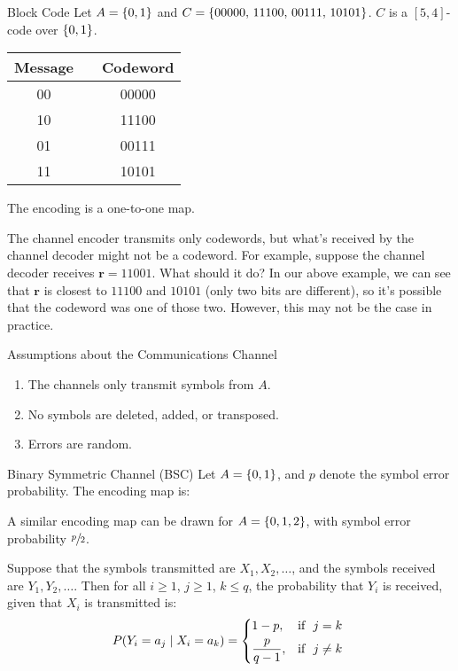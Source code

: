 \begin{Example}{Block Code}{}
    Let $ A=\{0,1\} $ and $ C=\{00000,\,11100,\,00111,\,10101\} $.
    $ C $ is a $ [5,4] $-code over $ \{0,1\} $.
    \begin{table}[H]
        \centering
        \begin{tabular}{@{}ccc@{}}
            Message & \textrightarrow{} & Codeword \\
            \midrule
            00      & \textrightarrow{} & 00000    \\
            10      & \textrightarrow{} & 11100    \\
            01      & \textrightarrow{} & 00111    \\
            11      & \textrightarrow{} & 10101    \\
        \end{tabular}
    \end{table}
    The encoding is a one-to-one map.
\end{Example}

The channel encoder transmits only codewords, but what's received by the channel
decoder might not be a codeword. For example, suppose the channel decoder
receives $ \symbf{r}=11001 $. What should it do? In our above example, we can see
that $ \symbf{r} $ is closest to $ 11100 $ and $ 10101 $ (only two bits are different),
so it's possible that the codeword was one of those two. However,
this may not be the case in practice.

\begin{Definition}{Assumptions about the Communications Channel}{}
    \begin{enumerate}[label=(\Roman*)]
        \item The channels only transmit symbols from $ A $.
        \item No symbols are deleted, added, or transposed.
        \item Errors are random.
    \end{enumerate}
\end{Definition}

\begin{Example}{Binary Symmetric Channel (BSC)}{}
    Let $ A=\{0,1\} $, and $ p $ denote the symbol error probability.
    The encoding map is:
    \begin{center}
        
    \end{center}
    A similar encoding map can be drawn for $ A=\{0,1,2\} $,
    with symbol error probability $ \sfrac{p}{2} $.

    Suppose that the symbols transmitted are $ X_1,X_2,\ldots $,
    and the symbols received are $ Y_1,Y_2,\ldots $. Then for all
    $ i\geqslant 1 $, $ j\geqslant 1 $, $ k\leqslant q $, the probability
    that $ Y_i $ is received, given that $ X_i $ is transmitted is:
    \[ P(Y_i=a_j\mid X_i=a_k)=
        \begin{dcases*}
            1-p,            & \text{if } $ j=k $     \\
            \frac{p}{q-1}, & \text{if } $ j\neq{}k $
        \end{dcases*} \]
\end{Example}

